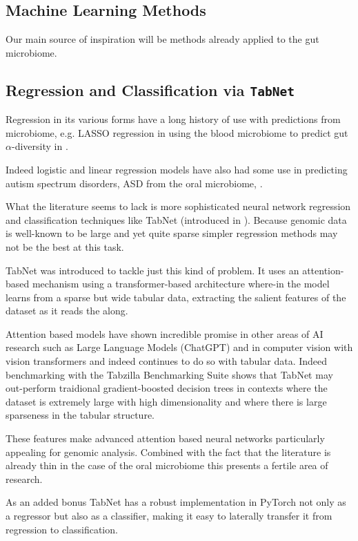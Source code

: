 \documentclass{article}
\begin{document}
\begin{multicols}{2}
\section{Machine Learning Methods} 
Our main source of inspiration will be methods already applied to the gut microbiome. 
\subsection{Regression and Classification via \texttt{TabNet}}
Regression in its various forms have a long history of use with predictions from microbiome, e.g. LASSO regression in using the blood microbiome to predict gut $\alpha$-diversity in \cite{wilmanski_blood_2019}. 

Indeed logistic and linear regression models have also had some use in predicting autism spectrum disorders, ASD from the oral microbiome, \cite{li_genetic_2022}. 

What the literature seems to lack is more sophisticated neural network regression and classification techniques like TabNet (introduced in \cite{arik_tabnet_2021}). Because genomic data is well-known to be large and yet quite sparse simpler regression methods may not be the best at this task. 

TabNet was introduced to tackle just this kind of problem. It uses an attention-based mechanism using a transformer-based \cite{vaswani_attention_2017} architecture where-in the model learns from a sparse but wide tabular data, extracting the salient features of the dataset as it reads the along. 

Attention based models have shown incredible promise in other areas of AI research such as Large Language Models (ChatGPT) and in computer vision with vision transformers and indeed continues to do so with tabular data. Indeed benchmarking with the Tabzilla Benchmarking Suite \cite{mcelfresh2023neural} shows that TabNet may out-perform traidional gradient-boosted decision trees in contexts where the dataset is extremely large with high dimensionality and where there is large sparseness in the tabular structure.

These features make advanced attention based neural networks particularly appealing for genomic analysis. Combined with the fact that the literature is already thin in the case of the oral microbiome this presents a fertile area of research. 

As an added bonus TabNet has a robust implementation in PyTorch not only as a regressor but also as a classifier, making it easy to laterally transfer it from regression to classification.


\end{multicols}
\end{document}
